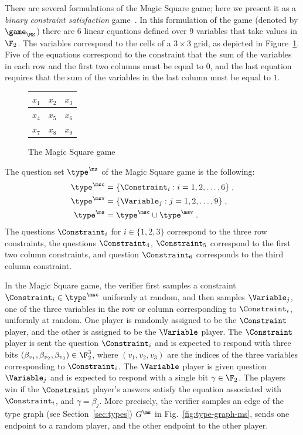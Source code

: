 There are several formulations of the Magic Square game; here we present it as a
\emph{binary constraint satisfaction} game~\cite{cleve2014characterization}.
In this formulation of the game (denoted by $\game_\MS$) there are $6$ linear
equations defined over $9$ variables that take values in $\F_2$.
The variables correspond to the cells of a $3 \times 3$ grid, as depicted in
Figure~\ref{fig:ms}.
Five of the equations correspond to the constraint that the sum of the variables
in each row and the first two columns must be equal to $0$, and the last
equation requires that the sum of the variables in the last column must be equal
to $1$.

\begin{figure}[ht!]
	\begin{center}
    \renewcommand{\arraystretch}{1.6}
		\begin{tabular}{|c|c|c|}
			\hline
			$x_1$ & $x_2$ & $x_3$ \\
			\hline 
			$x_4$ & $x_5$ & $x_6$ \\	
			\hline
			$x_7$ & $x_8$ & $x_9$ \\
			\hline
		\end{tabular}
		\caption{The Magic Square game}
		\label{fig:ms}
		\end{center}
\end{figure}

The question set $\type^\ms$ of the Magic Square game is the following:
\begin{equation*}
  \begin{split}
    \type^\msc & = \{ \Constraint_i : i = 1, 2, \ldots, 6\}\;,\\
    \type^\msv & = \{ \Variable_j : j = 1, 2, \ldots, 9\}\;,\\
    \type^\ms & = \type^\msc \cup \type^\msv\;.
  \end{split}
\end{equation*}
The questions $\Constraint_i$ for $i \in \{1,2,3\}$ correspond to the three row
constraints, the questions $\Constraint_4$, $\Constraint_5$ correspond to the first
two column constraints, and question $\Constraint_6$ corresponds to the third
column constraint.

In the Magic Square game, the verifier first samples a constraint $\Constraint_i
\in \type^\msc$ uniformly at random, and then samples $\Variable_j$, one of the
three variables in the row or column corresponding to $\Constraint_i$, uniformly
at random.
One player is randomly assigned to be the $\Constraint$ player, and the other is
assigned to be the $\Variable$ player.
The $\Constraint$ player is sent the question $\Constraint_i$ and is expected to
respond with three bits $(\beta_{v_1}, \beta_{v_2}, \beta_{v_3}) \in \F_2^3$,
where $(v_1,v_2,v_3)$ are the indices of the three variables corresponding to
$\Constraint_i$.
The $\Variable$ player is given question $\Variable_j$ and is expected to
respond with a single bit $\gamma \in \F_2$.
The players win if the $\Constraint$ player's answers satisfy the equation
associated with $\Constraint_i$, and $\gamma = \beta_j$.
More precisely, the verifier samples an edge of the type graph (see Section~\ref{sec:types}) $G^\ms$
in Fig.~\ref{fig:type-graph-ms}, sends one endpoint to a random player, and the
other endpoint to the other player.

